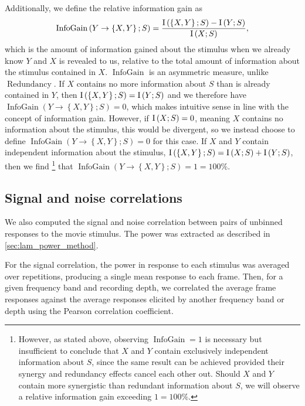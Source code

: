 Additionally, we define the relative information gain as
\begin{equation}
\label{eq:infogain}
\operatorname{InfoGain}\left(Y\to\left\{X,Y\right\};S\right)=\frac{
\operatorname{I}\left(\left\{X,Y\right\};S\right) - \operatorname{I}\left(Y;S\right)
}{
\operatorname{I}\left(X;S\right)
},
\end{equation}
which is the amount of information gained about the stimulus when we already know $Y$ and $X$ is revealed to us, relative to the total amount of information about the stimulus contained in $X$.
$\operatorname{InfoGain}$ is an asymmetric measure, unlike $\operatorname{Redundancy}$.
If $X$ contains no more information about $S$ than is already contained in $Y$, then
$\operatorname{I}\left(\left\{X,Y\right\};S\right) = \operatorname{I}\left(Y;S\right)$
and we therefore have
$
\operatorname{InfoGain}\left(Y\to\left\{X,Y\right\};S\right)=0
$,
which makes intuitive sense in line with the concept of information gain.
However, if $\operatorname{I}\left(X;S\right)=0$, meaning $X$ contains no information about the stimulus, this would be divergent, so we instead choose to define
$
\operatorname{InfoGain}\left(Y\to\left\{X,Y\right\};S\right)=0
$
for this case.
If $X$ and $Y$ contain independent information about the stimulus,
$\operatorname{I}\left(\left\{X,Y\right\};S\right) = \operatorname{I}\left(X;S\right) + \operatorname{I}\left(Y;S\right)$,
then we find%
\footnote{
However, as stated above, observing
$\operatorname{InfoGain} = 1$
is necessary but insufficient to conclude that $X$ and $Y$ contain exclusively independent information about $S$, since the same result can be achieved provided their synergy and redundancy effects cancel each other out.
Should $X$ and $Y$ contain more synergistic than redundant information about $S$, we will observe a relative information gain exceeding $1 = 100\%$.
}
that
$
\operatorname{InfoGain}\left(Y\to\left\{X,Y\right\};S\right) = 1 = 100\%
$.


\subsection{Signal and noise correlations}

We also computed the signal and noise correlation between pairs of unbinned responses to the movie stimulus.
The power was extracted as described in \autoref{sec:lam_power_method}.

For the signal correlation, the power in response to each stimulus was averaged over repetitions, producing a single mean response to each frame.
Then, for a given frequency band and recording depth, we correlated the average frame responses against the average responses elicited by another frequency band or depth using the Pearson correlation coefficient.

